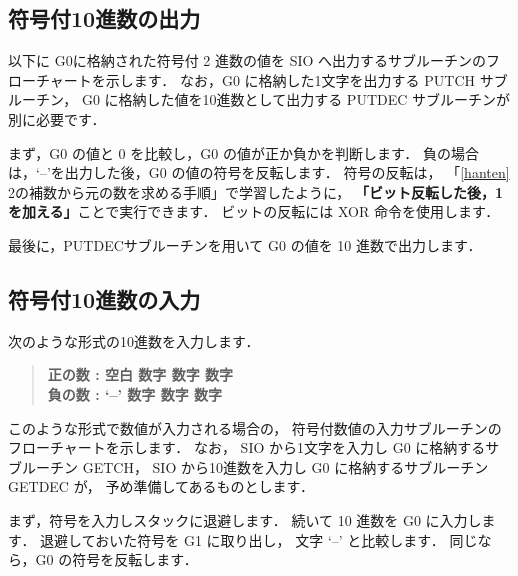 \subsection{符号付10進数の出力}

以下に
G0に格納された符号付 2 進数の値を
SIO へ出力するサブルーチンのフローチャートを示します．
なお，G0 に格納した1文字を出力する PUTCH サブルーチン，
G0 に格納した値を10進数として出力する PUTDEC サブルーチンが別に必要です．

まず，G0 の値と 0 を比較し，G0 の値が正か負かを判断します．
負の場合は，`--'を出力した後，G0 の値の符号を反転します．
符号の反転は，
「\ref{hanten} 2の補数から元の数を求める手順」で学習したように，
{\bf 「ビット反転した後，1を加える」}ことで実行できます．
ビットの反転には XOR 命令を使用します．

最後に，PUTDECサブルーチンを用いて G0 の値を 10 進数で出力します．

\begin{center}
\epsfxsize=4.8cm
\end{center}


\subsection{符号付10進数の入力}

次のような形式の10進数を入力します．

\begin{quote}
{\bf 正の数 :  空白 数字 数字 数字} \\
{\bf 負の数 :  `--' 数字 数字 数字}
\end{quote}

このような形式で数値が入力される場合の，
符号付数値の入力サブルーチンのフローチャートを示します．
なお，
SIO から1文字を入力し G0 に格納するサブルーチン GETCH，
SIO から10進数を入力し G0 に格納するサブルーチン GETDEC が，
予め準備してあるものとします．

まず，符号を入力しスタックに退避します．
続いて 10 進数を G0 に入力します．
退避しておいた符号を G1 に取り出し，
文字 `--' と比較します．
同じなら，G0 の符号を反転します．

\begin{center}
\epsfxsize=4.9cm
\end{center}

